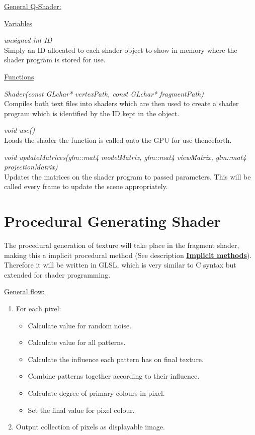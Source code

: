 \documentclass{report}
\begin{document}
\noindent\underline{General Q-Shader:}

\noindent\underline{Variables}

\noindent\textit{unsigned int ID}\\
Simply an ID allocated to each shader object to show in memory where the shader program is stored for use.

\noindent\underline{Functions}

\noindent\textit{Shader(const GLchar* vertexPath, const GLchar* fragmentPath)}\\
Compiles both text files into shaders which are then used to create a shader program which is identified by the ID kept in the object.

\noindent\textit{void use()}\\
Loads the shader the function is called onto the GPU for use thenceforth.

\noindent\textit{void updateMatrices(glm::mat4 modelMatrix, glm::mat4 viewMatrix, glm::mat4 projectionMatrix)}\\
Updates the matrices on the shader program to passed parameters. This will be called every frame to update the scene appropriately.

\section{Procedural Generating Shader}
The procedural generation of texture will take place in the fragment shader, making this a implicit procedural method (See description \hyperlink{txt:im}{\textbf{Implicit methods}}).
Therefore it will be written in GLSL, which is very similar to C syntax but extended for shader programming.

\noindent\underline{General flow:}
\begin{enumerate}
	\item For each pixel:
	\begin{itemize}
		\item Calculate value for random noise.
		\item Calculate value for all patterns.
		\item Calculate the influence each pattern has on final texture.
		\item Combine patterns together according to their influence.
		\item Calculate degree of primary colours in pixel.
		\item Set the final value for pixel colour.
	\end{itemize}
	\item Output collection of pixels as displayable image.
\end{enumerate}
\end{document}
